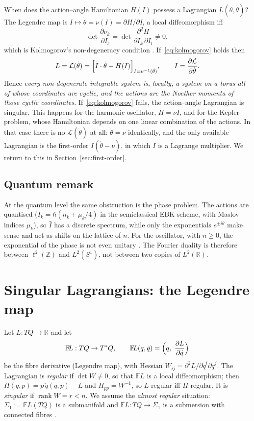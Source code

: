 \documentclass[11pt,a4paper]{article}
\theoremstyle{definition}
\theoremstyle{remark}
\newcommand{\R}{\mathbb{R}}
\newcommand{\FL}{\mathbb{F}\!L}
\DeclareMathOperator{\rank}{rank}
\begin{document}
When does the action--angle Hamiltonian $H(I)$ possess a Lagrangian $L(\theta,\dot\theta)$? The Legendre map is $I\mapsto\dot\theta=\nu(I)=\partial H/\partial I$, a local diffeomorphism iff
\begin{equation}\label{eq:kolmogorov}
\det\frac{\partial\nu_k}{\partial I_l}=\det\frac{\partial^2H}{\partial I_k\,\partial I_l}\neq0 ,
\end{equation}
which is Kolmogorov's non-degeneracy condition \cite{arnold}. If~\eqref{eq:kolmogorov} holds then
\[
L=\mathcal L(\dot\theta)=\Bigl[I\cdot\dot\theta-H(I)\Bigr]_{I=\nu^{-1}(\dot\theta)},\qquad I=\frac{\partial\mathcal L}{\partial\dot\theta}.
\]
Hence \emph{every non-degenerate integrable system is, locally, a system on a torus all of whose coordinates are cyclic, and the actions are the Noether momenta of those cyclic coordinates.} If~\eqref{eq:kolmogorov} fails, the action--angle Lagrangian is singular. This happens for the harmonic oscillator, $H=\nu I$, and for the Kepler problem, whose Hamiltonian depends on one linear combination of the actions. In that case there is no $\mathcal L(\dot\theta)$ at all: $\dot\theta=\nu$ identically, and the only available Lagrangian is the first-order $I(\dot\theta-\nu)$, in which $I$ is a Lagrange multiplier. We return to this in Section~\ref{sec:first-order}.

\subsection{Quantum remark}

At the quantum level the same obstruction is the phase problem. The actions are quantised ($I_k=\hbar(n_k+\mu_k/4)$ in the semiclassical EBK scheme, with Maslov indices $\mu_k$), so $\hat I$ has a discrete spectrum, while only the exponentials $e^{\pm i\theta}$ make sense and act as shifts on the lattice of $n$. For the oscillator, with $n\ge0$, the exponential of the phase is not even unitary \cite{dirac27,sg64}. The Fourier duality is therefore between $\ell^2(\mathbb Z)$ and $L^2(S^1)$, not between two copies of $L^2(\R)$.

\section{Singular Lagrangians: the Legendre map}

Let $L:TQ\to\R$ and let
\[
\FL:TQ\to T^*Q,\qquad \FL(q,\dot q)=\Bigl(q,\ \frac{\partial L}{\partial\dot q}\Bigr)
\]
be the fibre derivative (Legendre map), with Hessian $W_{ij}=\partial^2L/\partial\dot q^i\partial\dot q^j$. The Lagrangian is \emph{regular} if $\det W\neq0$, so that $\FL$ is a local diffeomorphism; then $H(q,p)=p\,\dot q(q,p)-L$ and $H_{pp}=W^{-1}$, so $L$ regular iff $H$ regular. It is \emph{singular} if $\rank W=r<n$. We assume the \emph{almost regular} situation: $\Sigma_1:=\FL(TQ)$ is a submanifold and $\FL:TQ\to\Sigma_1$ is a submersion with connected fibres \cite{gnh}.
\end{document}
